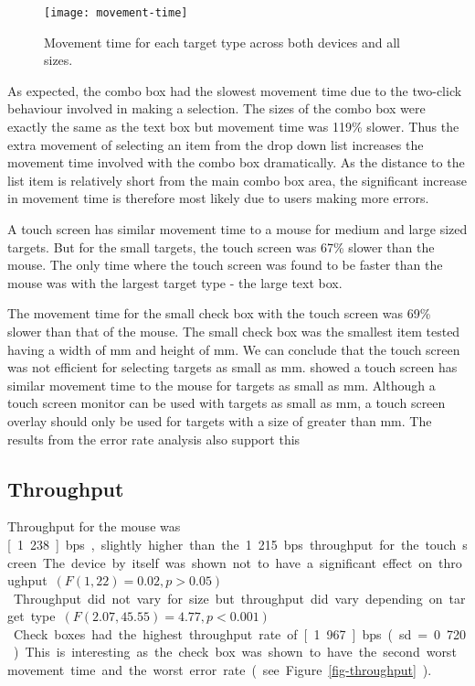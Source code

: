 \documentclass{elsart}
\begin{document}
\begin{figure}
	\texttt{[image: movement-time]}
	\caption{Movement time for each target type across both devices and
	all sizes.}
	\label{fig-movement-time}
\end{figure}

As expected, the combo box had the slowest movement time due to the
two-click behaviour involved in making a selection. The sizes of the
combo box were exactly the same as the text box but movement time was
119\% slower. Thus the extra movement of selecting an item from the drop
down list increases the movement time involved with the combo box
dramatically. As the distance to the list item is relatively short from
the main combo box area, the significant increase in movement time is
therefore most likely due to users making more errors.

A touch screen has similar movement time to a mouse for medium and large
sized targets. But for the small targets, the touch screen was 67\%
slower than the mouse. The only time where the touch screen was found to
be faster than the mouse was with the largest target type - the large
text box.

The movement time for the small check box with the touch screen was 69\%
slower than that of the mouse. The small check box was the smallest item
tested having a width of \unit[4]{mm} and height of \unit[4]{mm}. We can
conclude that the touch screen was not efficient for selecting targets
as small as \unit[4]{mm}. \citet{Sear-A-1991-IJMMS} showed a touch
screen has similar movement time to the mouse for targets as small as
\unit[2]{mm}. Although a touch screen monitor can be used with targets
as small as \unit[2]{mm}, a touch screen overlay should only be used for
targets with a size of greater than \unit[4]{mm}. The results from the
error rate analysis also support this

\subsection{Throughput}
\label{sec-results-throughput}

Throughput for the mouse was \unit[1.238]{bps}, slightly higher than the
1.215 bps throughput for the touch screen. The device by itself was
shown not to have a significant effect on throughput \((F(1, 22) = 0.02,
p > 0.05)\). Throughput did not vary for size but throughput did vary
depending on target type \((F(2.07, 45.55) = 4.77, p < 0.001)\). Check
boxes had the highest throughput rate of \unit[1.967]{bps} (sd = 0.720).
This is interesting as the check box was shown to have the second worst
movement time and the worst error rate (see
Figure~\ref{fig-throughput}).
\end{document}
